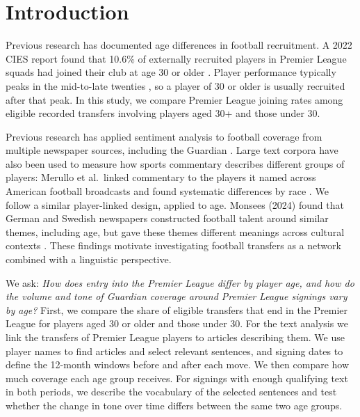 \section*{Introduction}

Previous research has documented age differences in football recruitment. A 2022 CIES report found that 10.6\% of externally recruited players in Premier League squads had joined their club at age 30 or older \cite{poli2022recruitment}. Player performance typically peaks in the mid-to-late twenties \cite{dendir2016peak}, so a player of 30 or older is usually recruited after that peak. In this study, we compare Premier League joining rates among eligible recorded transfers involving players aged 30+ and those under 30.

Previous research has applied sentiment analysis to football coverage from multiple newspaper sources, including the Guardian \cite{dotgrau2019representation}. Large text corpora have also been used to measure how sports commentary describes different groups of players: Merullo et al.\ linked commentary to the players it named across 
American football broadcasts and found systematic differences by race \cite{merullo2019commentator}. We follow a similar player-linked design, applied to age. Monsees (2024) found that German and Swedish newspapers constructed football talent around similar themes, including age, but gave these themes different meanings across cultural contexts \cite{monsees2024talent}. These findings motivate investigating football transfers as a network combined with a linguistic perspective.

We ask: \textit{How does entry into the Premier League differ by player age, and how do the volume and tone of Guardian coverage around Premier League signings vary by age?} First, we compare the share of eligible transfers that end in the Premier League for players aged 30 or older and those under 30.
For the text analysis we link the transfers of Premier League players to articles describing them. We use player names to find articles and select relevant sentences, and signing dates to define the 12-month windows before and after each move. We then compare how much coverage each age group receives. For signings with enough qualifying text in both periods, we describe the vocabulary of the selected sentences and test whether the change in tone over time differs between the same two age groups.





